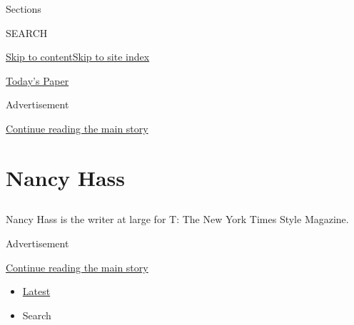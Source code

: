 Sections

SEARCH

\protect\hyperlink{site-content}{Skip to
content}\protect\hyperlink{site-index}{Skip to site index}

\href{https://myaccount.nytimes3xbfgragh.onion/auth/login?response_type=cookie\&client_id=vi}{}

\href{https://www.nytimes3xbfgragh.onion/section/todayspaper}{Today's
Paper}

Advertisement

\protect\hyperlink{after-top}{Continue reading the main story}

\hypertarget{nancy-hass}{%
\section{Nancy Hass}\label{nancy-hass}}

\subsection{}

Nancy Hass is the writer at large for T: The New York Times Style
Magazine.

Advertisement

\protect\hyperlink{after-mid1}{Continue reading the main story}

\begin{itemize}
\tightlist
\item
  \protect\hyperlink{stream-panel}{Latest}
\item
  Search
\end{itemize}

